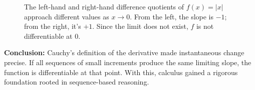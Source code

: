 \begin{figure}[H]
\centering
{}
\caption{
The left-hand and right-hand difference quotients of \( f(x) = |x| \) approach different values as \( x \to 0 \). From the left, the slope is \(-1\); from the right, it’s \(+1\). Since the limit does not exist, \( f \) is not differentiable at 0.
}
\end{figure}





\bigskip

\textbf{Conclusion:} Cauchy’s definition of the derivative made instantaneous change precise. If all sequences of small increments produce the same limiting slope, the function is differentiable at that point. With this, calculus gained a rigorous foundation rooted in sequence-based reasoning.



